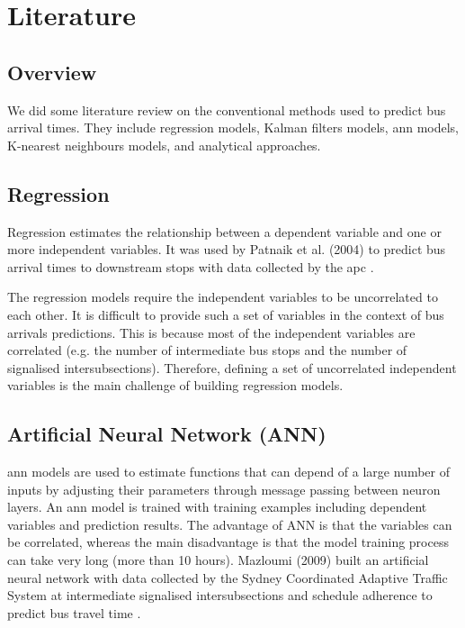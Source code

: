\section{Literature}
\label{sec:literature}
\subsection{Overview}
\par We did some literature review on the conventional methods used to predict bus arrival times. They include regression models, Kalman filters models, \acrfull{ann} models, K-nearest neighbours models, and analytical approaches.

\subsection{Regression}
\par Regression estimates the relationship between a dependent variable and one or more independent variables. It was used by Patnaik et al. (2004) to predict bus arrival times to downstream stops with data collected by the \acrfull{apc} \cite{regression_models}.

\par The regression models require the independent variables to be uncorrelated to each other. It is difficult to provide such a set of variables in the context of bus arrivals predictions. This is because most of the independent variables are correlated (e.g. the number of intermediate bus stops and the number of signalised intersubsections). Therefore, defining a set of uncorrelated independent variables is the main challenge of building regression models.

\subsection{Artificial Neural Network (ANN)}
\par \acrshort{ann} models are used to estimate functions that can depend of a large number of inputs by adjusting their parameters through message passing between neuron layers. An \acrshort{ann} model is trained with training examples including dependent variables and prediction results. The advantage of ANN is that the variables can be correlated, whereas the main disadvantage is that the model training process can take very long (more than 10 hours). Mazloumi (2009) built an artificial neural network with data collected by the Sydney Coordinated Adaptive Traffic System at intermediate signalised intersubsections and schedule adherence to predict bus travel time \cite{ann}.


